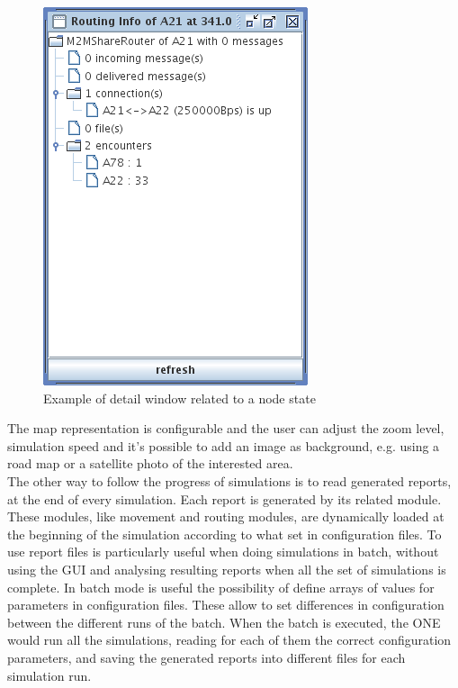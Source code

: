 \begin{figure}[htpb]
  \begin{center}
    \includegraphics[scale=0.6]{5-simulatore/img/Routing-Info.png}
    \caption[Routing Info]{Example of detail window related to a node state}    
    \label{Routing-Info}
  \end{center}
\end{figure}

The map representation is configurable and the user can adjust the zoom level, simulation speed and it's possible to add an image as background, e.g. using a road map or a satellite photo of the interested area.
\\

The other way to follow the progress of simulations is to read generated reports, at the end of every simulation. Each report is generated by its related module. These modules, like movement and routing modules, are dynamically loaded at the beginning of the simulation according to what set in configuration files. To use report files is particularly useful when doing simulations in batch, without using the GUI and analysing resulting reports when all the set of simulations is complete. In batch mode is useful the possibility of define arrays of values for parameters in configuration files. These allow to set differences in configuration between the different runs of the batch. When the batch is executed, the ONE would run all the simulations, reading for each of them the correct configuration parameters, and saving the generated reports into different files for each simulation run.
\\

